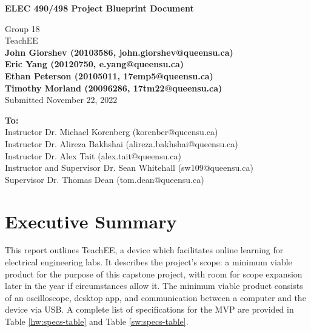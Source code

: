 \documentclass[letterpaper,12pt]{article}
\begin{document}
\begin{titlepage}
    \begin{center}
        \vspace*{1cm}

        \Large
        \textbf{ELEC 490/498 Project Blueprint Document}

        \vspace{0.5cm}
        Group 18\\
        TeachEE\\
        \vspace{0.5cm}
        \normalsize
        \textbf{John Giorshev (20103586, john.giorshev@queensu.ca) \\ Eric Yang (20120750, e.yang@queensu.ca) \\ Ethan Peterson (20105011, 17emp5@queensu.ca) \\ Timothy Morland (20096286, 17tm22@queensu.ca)}\\
        \vspace{0.5cm}
        Submitted November 22, 2022\\

        \vfill
            
        \textbf{To:}\\
        Instructor Dr. Michael Korenberg (korenber@queensu.ca) \\
        Instructor Dr. Alireza Bakhshai (alireza.bakhshai@queensu.ca) \\
        Instructor Dr. Alex Tait (alex.tait@queensu.ca) \\
        Instructor and Supervisor Dr. Sean Whitehall (sw109@queensu.ca) \\
        Supervisor Dr. Thomas Dean (tom.dean@queensu.ca) \\
            
        \vspace{1.8cm}

    \end{center}
\end{titlepage}
\section*{Executive Summary}

This report outlines TeachEE, a device which facilitates online learning for
electrical engineering labs. It describes the project's scope: a minimum viable
product for the purpose of this capstone project, with room for scope expansion
later in the year if circumstances allow it. The minimum viable product consists
of an oscilloscope, desktop app, and communication between a computer and the
device via USB. A complete list of specifications for the MVP are provided in
Table \ref{hw:specs-table} and Table \ref{sw:specs-table}.
\end{document}
